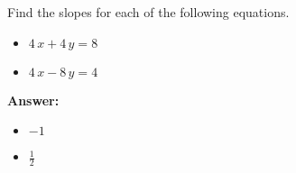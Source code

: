  Find the slopes for each of the following equations. \begin{itemize}\item \( 4 \, x + 4 \, y = 8 \)\item \( 4 \, x - 8 \, y = 4 \)\end{itemize}

        \textbf{Answer:} \begin{itemize}\item \( -1 \)\item \( \frac{1}{2} \)\end{itemize}
